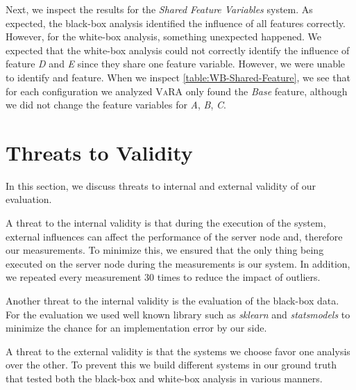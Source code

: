 Next, we inspect the results for the \emph{Shared Feature Variables} system. 
As expected, the black-box analysis identified the influence of all features correctly. 
However, for the white-box analysis, something unexpected happened. 
We expected that the white-box analysis could not correctly identify the influence of feature \emph{D} and \emph{E} since they share one 
feature variable. However, we were unable to identify and feature. When we inspect \autoref{table:WB-Shared-Feature}, 
we see that for each configuration we analyzed \textsc{VaRA} only found the \emph{Base} feature, 
although we did not change the feature variables for \emph{A}, \emph{B}, \emph{C}.

\section{Threats to Validity}\label{sec:threats}

In this section, we discuss threats to internal and external validity of our evaluation.

A threat to the internal validity is that during the execution of the system, 
external influences can affect the performance of the server node and, therefore our measurements. 
To minimize this, we ensured that the only thing being executed on the server node during the measurements is our system. 
In addition, we repeated every measurement $30$ times to reduce the impact of outliers.  

Another threat to the internal validity is the evaluation of the black-box data. 
For the evaluation we used well known library such as \emph{sklearn} and \emph{statsmodels} 
to minimize the chance for an implementation error by our side.

A threat to the external validity is that the systems we choose favor one analysis over the other. 
To prevent this we build different systems in our ground truth that tested both the black-box and white-box analysis 
in various manners.